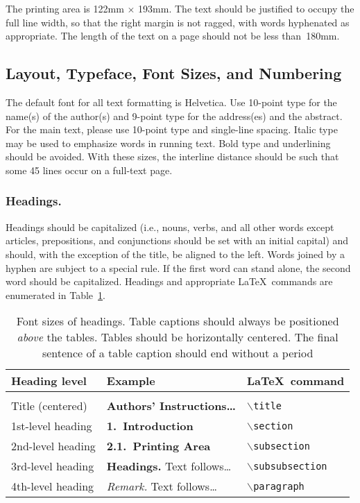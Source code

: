 \documentclass[runningheads]{comsis}
\begin{document}
The printing area is 122mm $\times$ 193mm. The text should be justified to
occupy the full line width, so that the right margin is not ragged, with words
hyphenated as appropriate. The length of the text on a page should not be less
than~180mm.

\subsection{Layout, Typeface, Font Sizes, and Numbering}

The default font for all text formatting is Helvetica. Use 10-point type for
the name(s) of the author(s) and 9-point type for the address(es) and the
abstract. For the main text, please use 10-point type and single-line spacing.
Italic type may be used to emphasize words in running text. Bold type and
underlining should be avoided. With these sizes, the interline distance should
be such that some 45 lines occur on a full-text page.

\subsubsection{Headings.} Headings should be capitalized (i.e., nouns, verbs, and
all other words except articles, prepositions, and conjunctions should be set
with an initial capital) and should, with the exception of the title, be
aligned to the left. Words joined by a hyphen are subject to a special rule.
If the first word can stand alone, the second word should be capitalized.
Headings and appropriate \LaTeX\ commands are enumerated in
Table~\ref{tbl:headings}.

\begin{table}
\caption{Font sizes of headings. Table captions should always be positioned
\emph{above} the tables. Tables should be horizontally centered. The final
sentence of a table caption should end without a period}\label{tbl:headings}
\centering
\setlength\tabcolsep{0.5em}
\begin{tabular}{lll}
\hline
Heading level      & Example                                    & \LaTeX\ command \\ \hline \\[-2ex]
Title (centered)   & \textbf{\Large Authors' Instructions\dots} & \texttt{$\backslash$title} \\
1st-level heading  & \textbf{\large 1.\ Introduction}           & \texttt{$\backslash$section} \\
2nd-level heading  & \textbf{2.1.\ Printing Area}               & \texttt{$\backslash$subsection} \\
3rd-level heading  & \textbf{Headings.} Text follows\dots       & \texttt{$\backslash$subsubsection} \\
4th-level heading  & \textit{Remark.} Text follows\dots         & \texttt{$\backslash$paragraph} \\ \hline
\end{tabular}
\end{table}
\end{document}
